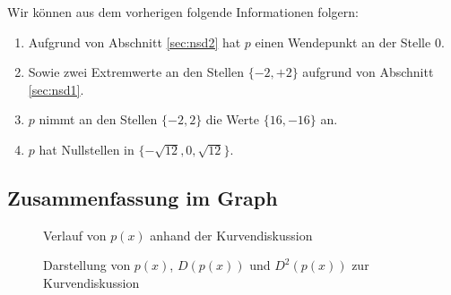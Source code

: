 Wir können aus dem vorherigen folgende Informationen folgern:

\begin{enumerate}
\item Aufgrund von Abschnitt \ref{sec:nsd2} hat $p$ einen Wendepunkt an der Stelle 0.
\item Sowie zwei Extremwerte an den Stellen $\{-2, +2\}$ aufgrund von Abschnitt \ref{sec:nsd1}.
\item $p$ nimmt an den Stellen $\{-2,2\}$ die Werte $\{16,-16\}$ an. 
\item $p$ hat Nullstellen in $\{-\sqrt{12},0,\sqrt{12}\}$.
\end{enumerate}




\subsection{Zusammenfassung im Graph}

\begin{figure}
\begin{center}
\caption[Polynom zur Kurvendiskussion]{Verlauf von $p(x)$ anhand der Kurvendiskussion}
\label{fig:pkd}
\end{center}
\end{figure}


\begin{figure}
\begin{center}
\caption[Vollständige Darstellung zur Kurvendiskussion]{Darstellung von $p(x)$, $D(p(x))$ und $D^2(p(x))$ zur Kurvendiskussion}
\label{fig:kdvoll}
\end{center}
\end{figure}


